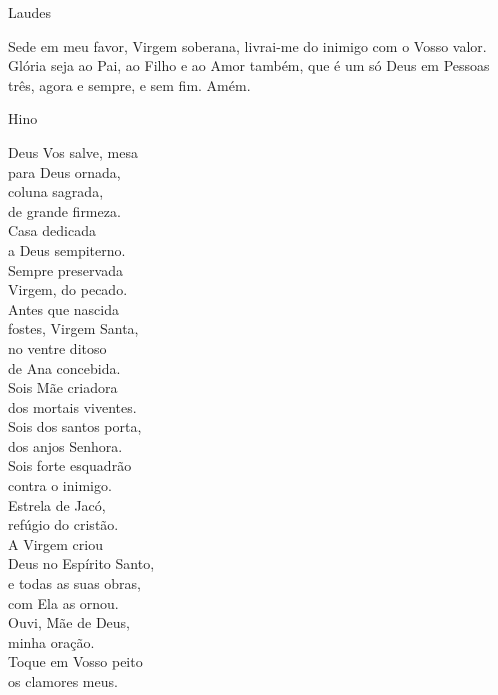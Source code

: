 \begin{center}
    Laudes
\end{center}
\begin{flushleft}
    Sede em meu favor, Virgem soberana, livrai-me do inimigo com o Vosso valor. Glória seja ao Pai, ao Filho e ao Amor também, que é um só Deus em Pessoas três, agora e sempre, e sem fim. Amém.
\end{flushleft}
\begin{center}
    \textcolor{VioletRed3}{Hino}
\end{center}
\begin{multicols}{2}\setlength{\parindent}{0pt}
    Deus Vos salve, mesa \\
    para Deus ornada, \\
    coluna sagrada, \\
    de grande firmeza.
    \vspace{.2cm} \\
    Casa dedicada \\
    a Deus sempiterno. \\
    Sempre preservada \\
    Virgem, do pecado.
    \vspace{.2cm} \\
    Antes que nascida \\
    fostes, Virgem Santa, \\
    no ventre ditoso \\
    de Ana concebida.
    \vspace{.2cm} \\
    Sois Mãe criadora \\
    dos mortais viventes. \\
    Sois dos santos porta, \\
    dos anjos Senhora.
    \vspace{.2cm} \\
    Sois forte esquadrão \\
    contra o inimigo. \\
    Estrela de Jacó, \\
    refúgio do cristão.
    \vspace{.2cm} \\
    A Virgem criou \\
    Deus no Espírito Santo, \\
    e todas as suas obras, \\
    com Ela as ornou.
    \vspace{.2cm} \\
    Ouvi, Mãe de Deus, \\
    minha oração. \\
    Toque em Vosso peito \\
    os clamores meus.
\end{multicols}
